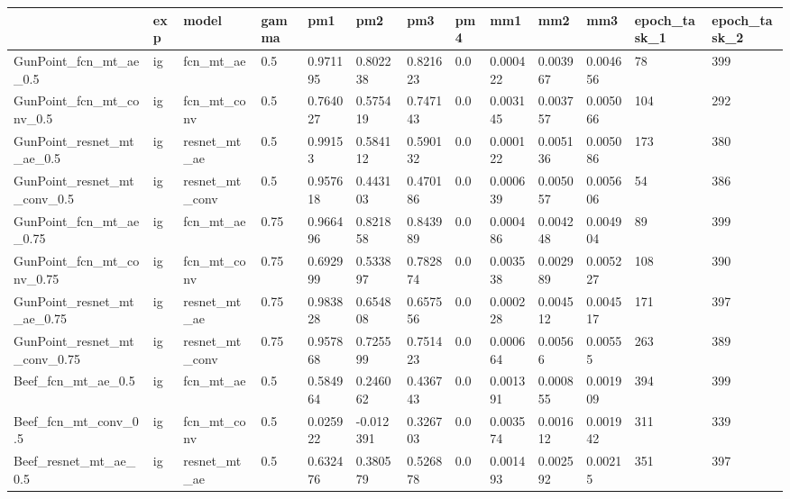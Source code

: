 \begin{tabular}{lllllllllllll}
\toprule
{} & exp &           model & gamma &       pm1 &       pm2 &       pm3 &  pm4 &       mm1 &       mm2 &       mm3 & epoch\_task\_1 & epoch\_task\_2 \\
\midrule
GunPoint\_fcn\_mt\_ae\_0.5       &  ig &       fcn\_mt\_ae &   0.5 &  0.971195 &  0.802238 &  0.821623 &  0.0 &  0.000422 &  0.003967 &  0.004656 &           78 &          399 \\
GunPoint\_fcn\_mt\_conv\_0.5     &  ig &     fcn\_mt\_conv &   0.5 &  0.764027 &  0.575419 &  0.747143 &  0.0 &  0.003145 &  0.003757 &  0.005066 &          104 &          292 \\
GunPoint\_resnet\_mt\_ae\_0.5    &  ig &    resnet\_mt\_ae &   0.5 &   0.99153 &  0.584112 &  0.590132 &  0.0 &  0.000122 &  0.005136 &  0.005086 &          173 &          380 \\
GunPoint\_resnet\_mt\_conv\_0.5  &  ig &  resnet\_mt\_conv &   0.5 &  0.957618 &  0.443103 &  0.470186 &  0.0 &  0.000639 &  0.005057 &  0.005606 &           54 &          386 \\
GunPoint\_fcn\_mt\_ae\_0.75      &  ig &       fcn\_mt\_ae &  0.75 &  0.966496 &  0.821858 &  0.843989 &  0.0 &  0.000486 &  0.004248 &  0.004904 &           89 &          399 \\
GunPoint\_fcn\_mt\_conv\_0.75    &  ig &     fcn\_mt\_conv &  0.75 &  0.692999 &  0.533897 &  0.782874 &  0.0 &  0.003538 &  0.002989 &  0.005227 &          108 &          390 \\
GunPoint\_resnet\_mt\_ae\_0.75   &  ig &    resnet\_mt\_ae &  0.75 &  0.983828 &  0.654808 &  0.657556 &  0.0 &  0.000228 &  0.004512 &  0.004517 &          171 &          397 \\
GunPoint\_resnet\_mt\_conv\_0.75 &  ig &  resnet\_mt\_conv &  0.75 &  0.957868 &  0.725599 &  0.751423 &  0.0 &  0.000664 &   0.00566 &   0.00555 &          263 &          389 \\
Beef\_fcn\_mt\_ae\_0.5           &  ig &       fcn\_mt\_ae &   0.5 &  0.584964 &  0.246062 &  0.436743 &  0.0 &  0.001391 &  0.000855 &  0.001909 &          394 &          399 \\
Beef\_fcn\_mt\_conv\_0.5         &  ig &     fcn\_mt\_conv &   0.5 &  0.025922 & -0.012391 &  0.326703 &  0.0 &  0.003574 &  0.001612 &  0.001942 &          311 &          339 \\
Beef\_resnet\_mt\_ae\_0.5        &  ig &    resnet\_mt\_ae &   0.5 &  0.632476 &  0.380579 &  0.526878 &  0.0 &  0.001493 &  0.002592 &   0.00215 &          351 &          397 \\

\end{tabular}
